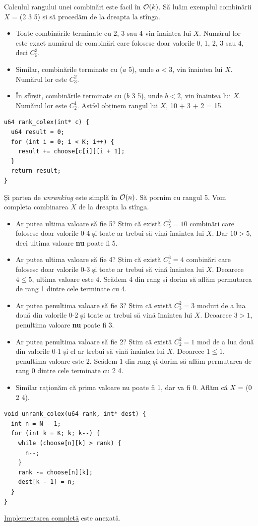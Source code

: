 \documentclass[../main.tex]{subfiles}
\begin{document}
Calculul rangului unei combinări este facil în $\mathcal{O}(k)$. Să luăm exemplul combinării $X$ = (2 3 5) și să procedăm de la dreapta la stînga.

\begin{itemize}
  \item Toate combinările terminate cu 2, 3 sau 4 vin înaintea lui $X$. Numărul lor este exact numărul de combinări care folosesc doar valorile 0, 1, 2, 3 sau 4, deci $C_5^3$.
  \item Similar, combinările terminate cu ($a$ 5), unde $a < 3$, vin înaintea lui $X$. Numărul lor este $C_3^2$.
  \item În sfîrșit, combinările terminate cu ($b$ 3 5), unde $b < 2$, vin înaintea lui $X$. Numărul lor este $C_2^1$. Astfel obținem rangul lui $X$, 10 + 3 + 2 = 15.
\end{itemize}

\begin{verbatim}
u64 rank_colex(int* c) {
  u64 result = 0;
  for (int i = 0; i < K; i++) {
    result += choose[c[i]][i + 1];
  }
  return result;
}
\end{verbatim}

Și partea de \textit{unranking} este simplă în $\mathcal{O}(n)$. Să pornim cu rangul 5. Vom completa combinarea $X$ de la dreapta la stînga.

\begin{itemize}
  \item Ar putea ultima valoare să fie 5? Știm că există $C_5^3 = 10$ combinări care folosesc doar valorile 0-4 și toate ar trebui să vină înaintea lui $X$. Dar $10 > 5$, deci ultima valoare \textbf{nu} poate fi 5.
  \item Ar putea ultima valoare să fie 4? Știm că există $C_4^3 = 4$ combinări care folosesc doar valorile 0-3 și toate ar trebui să vină înaintea lui $X$. Deoarece $4 \leq 5$, ultima valoare este 4. Scădem 4 din rang și dorim să aflăm permutarea de rang 1 dintre cele terminate cu 4.
  \item Ar putea penultima valoare să fie 3? Știm că există $C_3^2 = 3$ moduri de a lua două din valorile 0-2 și toate ar trebui să vină înaintea lui $X$. Deoarece $3 > 1$, penultima valoare \textbf{nu} poate fi 3.
  \item Ar putea penultima valoare să fie 2? Știm că există $C_2^2 = 1$ mod de a lua două din valorile 0-1 și el ar trebui să vină înaintea lui $X$. Deoarece $1 \leq 1$, penultima valoare este 2. Scădem 1 din rang și dorim să aflăm permutarea de rang 0 dintre cele terminate cu 2 4.
  \item Similar raționăm că prima valoare nu poate fi 1, dar va fi 0. Aflăm că $X$ = (0 2 4).
\end{itemize}

\begin{verbatim}
void unrank_colex(u64 rank, int* dest) {
  int n = N - 1;
  for (int k = K; k; k--) {
    while (choose[n][k] > rank) {
      n--;
    }
    rank -= choose[n][k];
    dest[k - 1] = n;
  }
}
\end{verbatim}

\label{problem:math-comb-rank}

\hyperref[code:math-comb-rank]{Implementarea completă} este anexată.
\end{document}
